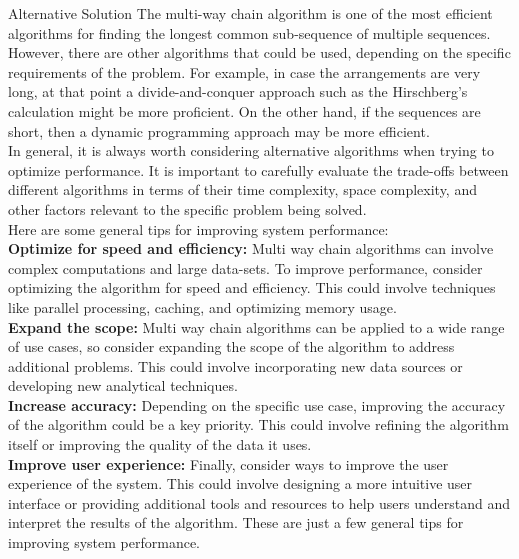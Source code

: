 \documentclass[final]{beamer}
\newlength{\colwidth}
\begin{document}
\begin{frame}[t]
\begin{columns}[t]
\begin{column}{\colwidth}
   		\begin{alertblock}{Alternative Solution}
			\justifying
             The multi-way chain algorithm is one of the most efficient algorithms for finding the longest common sub-sequence of multiple sequences. However, there are other algorithms that could be used, depending on the specific requirements of the problem. For example, in case the arrangements are very long, at that point a divide-and-conquer approach such as the Hirschberg's calculation might be more proficient.
On the other hand, if the sequences are short, then a dynamic programming approach may be more
efficient.\\
In general, it is always worth considering alternative algorithms when trying to optimize
performance. It is important to carefully evaluate the trade-offs between different algorithms in terms of
their time complexity, space complexity, and other factors relevant to the specific problem being solved.\\
Here are some general tips for improving system performance:\\
\textbf{Optimize for speed and efficiency:} Multi way chain algorithms can involve complex computations and
large data-sets. To improve performance, consider optimizing the algorithm for speed and efficiency. This could involve techniques like parallel processing, caching, and optimizing memory usage.\\
\textbf{Expand the scope:} Multi way chain algorithms can be applied to a wide range of use cases, so consider
expanding the scope of the algorithm to address additional problems. This could involve incorporating
new data sources or developing new analytical techniques.\\
\textbf{Increase accuracy:} Depending on the specific use case, improving the accuracy of the algorithm could be a key priority. This could involve refining the algorithm itself or improving the quality of the data it uses.\\
\textbf{Improve user experience:}  Finally, consider ways to improve the user experience of the system. This could involve designing a more intuitive user interface or providing additional tools and resources to help
users understand and interpret the results of the algorithm.
These are just a few general tips for improving system performance.


             
			\end{alertblock}
   

\end{column}
\end{columns}
\end{frame}
\end{document}
